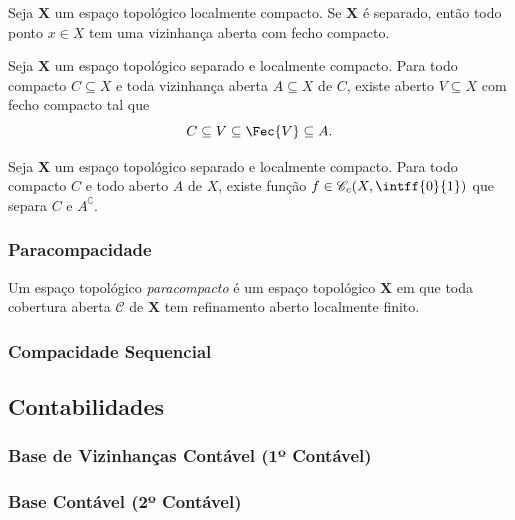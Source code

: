 \begin{prop}
Seja $\bm X$ um espaço topológico localmente compacto. Se $\bm X$ é separado, então todo ponto $x \in X$ tem uma vizinhança aberta com fecho compacto.
\end{prop}

\begin{prop}
Seja $\bm X$ um espaço topológico separado e localmente compacto. Para todo compacto $C \subseteq X$ e toda vizinhança aberta $A \subseteq X$ de $C$, existe aberto $V \subseteq X$ com fecho compacto tal que
	\begin{equation*}
	C \subseteq V \subseteq \Fec{V} \subseteq A.
	\end{equation*}
\end{prop}

\begin{prop}
Seja $\bm X$ um espaço topológico separado e localmente compacto. Para todo compacto $C$ e todo aberto $A$ de $X$, existe função $f \in \cont_c(X,\intff{0}{1})$ que separa $C$ e $A^\complement$.
\end{prop}


\subsubsection{Paracompacidade}

\begin{defi}
Um espaço topológico \emph{paracompacto} é um espaço topológico $\bm X$ em que toda cobertura aberta $\mathcal C$ de $\bm X$ tem refinamento aberto localmente finito.
\end{defi}

\subsubsection{Compacidade Sequencial}



\subsection{Contabilidades}

\subsubsection{Base de Vizinhanças Contável (1º Contável)}

\subsubsection{Base Contável (2º Contável)}










